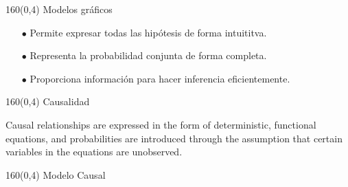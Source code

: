\documentclass[shownotes,aspectratio=169]{beamer}
\begin{document}
 
 \begin{frame}[plain]
    \begin{textblock}{160}(0,4)
    \centering \LARGE Modelos gráficos
    \end{textblock}
    \centering
    \vspace{0.75cm}

    
    \begin{itemize}
     \item[$\bullet$] Permite expresar todas las hipótesis de forma intuititva.
     \item[$\bullet$] Representa la probabilidad conjunta de forma completa.
     \item[$\bullet$] Proporciona información para hacer inferencia eficientemente.
    \end{itemize}

     
 \end{frame}

 
 \begin{frame}[plain]
 \begin{textblock}{160}(0,4)
 \centering \Large
 Causalidad
 \end{textblock}

 \centering \normalsize
 Causal relationships are expressed in the form of deterministic, functional equations, and probabilities are introduced through the assumption that certain variables in the equations are unobserved.

\end{frame} 


 \begin{frame}[plain]
\begin{textblock}{160}(0,4)
 \centering \Large
 Modelo Causal
 \end{textblock}
 \centering
 \vspace{0.75cm}
 


 
 \end{frame}
 
\end{document}
